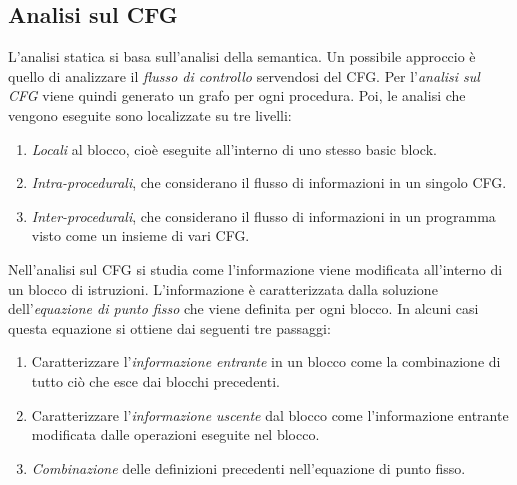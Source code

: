 \documentclass[a4paper,oneside,titlepage]{book}
\begin{document}
\subsection{Analisi sul CFG} %
L'analisi statica si basa sull'analisi della semantica. Un possibile approccio è quello di analizzare il \textit{flusso di controllo} servendosi del CFG. Per l'\textit{analisi sul CFG} viene quindi generato un grafo per ogni procedura. Poi, le analisi che vengono eseguite sono localizzate su tre livelli:
\begin{enumerate}
    \item \textit{Locali} al blocco, cioè eseguite all'interno di uno stesso basic block.
    \item \textit{Intra-procedurali}, che considerano il flusso di informazioni in un singolo CFG.
    \item \textit{Inter-procedurali}, che considerano il flusso di informazioni in un programma visto come un insieme di vari CFG.
\end{enumerate}
Nell'analisi sul CFG si studia come l'informazione viene modificata all'interno di un blocco di istruzioni. L'informazione è caratterizzata dalla soluzione dell'\textit{equazione di punto fisso} che viene definita per ogni blocco. In alcuni casi questa equazione si ottiene dai seguenti tre passaggi:
\begin{enumerate}
    \item Caratterizzare l'\textit{informazione entrante} in un blocco come la combinazione di tutto ciò che esce dai blocchi precedenti.
    \item Caratterizzare l'\textit{informazione uscente} dal blocco come l'informazione entrante modificata dalle operazioni eseguite nel blocco.
    \item \textit{Combinazione} delle definizioni precedenti nell'equazione di punto fisso.
\end{enumerate}
\end{document}
